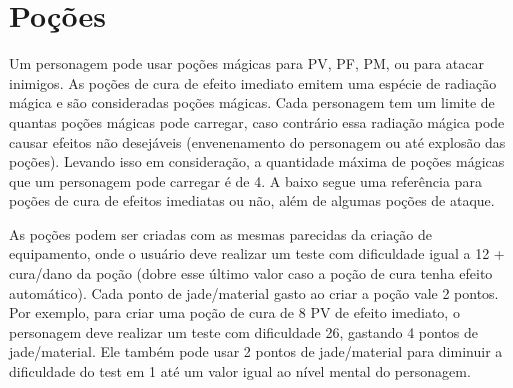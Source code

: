 \section{Poções}
Um personagem pode usar poções mágicas para PV, PF, PM, ou para atacar inimigos. As poções de cura de efeito imediato emitem uma espécie de radiação mágica e são consideradas poções mágicas. Cada personagem tem um limite de quantas poções mágicas pode carregar, caso contrário essa radiação mágica pode causar efeitos não desejáveis (envenenamento do personagem ou até explosão das poções). Levando isso em consideração, a quantidade máxima de poções mágicas que um personagem pode carregar é de 4. A baixo segue uma referência para poções de cura de efeitos imediatas ou não, além de algumas poções de ataque.

As poções podem ser criadas com as mesmas parecidas da criação de equipamento, onde o usuário deve realizar um teste com dificuldade igual a 12 + cura/dano da poção (dobre esse último valor caso a poção de cura tenha efeito automático). Cada ponto de jade/material gasto ao criar a poção vale 2 pontos. Por exemplo, para criar uma poção de cura de 8 PV de efeito imediato, o personagem deve realizar um teste com dificuldade 26, gastando 4 pontos de jade/material. Ele também pode usar 2 pontos de jade/material para diminuir a dificuldade do test em 1 até um valor igual ao nível mental do personagem.

